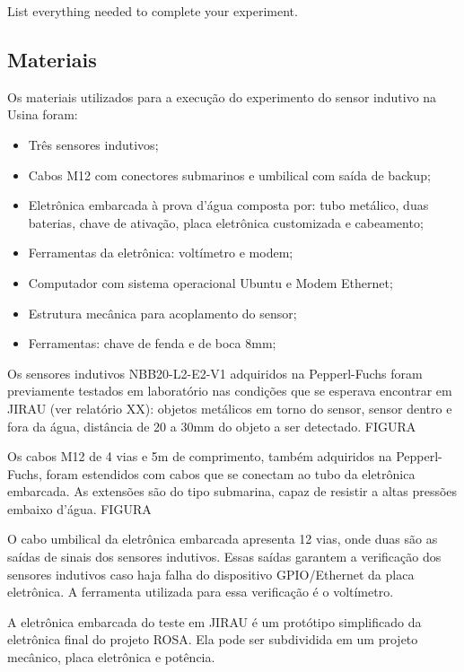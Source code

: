 
List everything needed to complete your experiment.



\subsection{Materiais}
Os materiais utilizados para a execução do experimento do sensor indutivo na
Usina foram:
\begin{itemize}
  \item Três sensores indutivos;
  \item Cabos M12 com conectores submarinos e umbilical com saída de backup;
  \item Eletrônica embarcada à prova d'água composta por: tubo metálico, duas
  baterias, chave de ativação, placa eletrônica customizada e cabeamento;
  \item Ferramentas da eletrônica: voltímetro e modem;
  \item Computador com sistema operacional Ubuntu e Modem Ethernet;
  \item Estrutura mecânica para acoplamento do sensor; 
  \item Ferramentas: chave de fenda e de boca 8mm;
\end{itemize}
Os sensores indutivos NBB20-L2-E2-V1 adquiridos na Pepperl-Fuchs foram
previamente testados em laboratório nas condições que se esperava encontrar em JIRAU (ver relatório XX): objetos
metálicos em torno do sensor, sensor dentro e fora da água, distância de 20 a
30mm do objeto a ser detectado. FIGURA

Os cabos M12 de 4 vias e 5m de comprimento, também adquiridos na Pepperl-Fuchs,
foram estendidos com cabos que se conectam ao tubo da eletrônica embarcada. As
extensões são do tipo submarina, capaz de resistir a altas pressões embaixo
d'água. FIGURA

O cabo umbilical da eletrônica embarcada apresenta 12 vias, onde duas são as
saídas de sinais dos sensores indutivos. Essas saídas garantem a
verificação dos sensores indutivos caso haja falha do dispositivo GPIO/Ethernet
da placa eletrônica. A ferramenta utilizada para essa verificação é o
voltímetro.

A eletrônica embarcada do teste em JIRAU é um protótipo simplificado da
eletrônica final do projeto ROSA. Ela pode ser subdividida em um projeto
mecânico, placa eletrônica e potência. 

